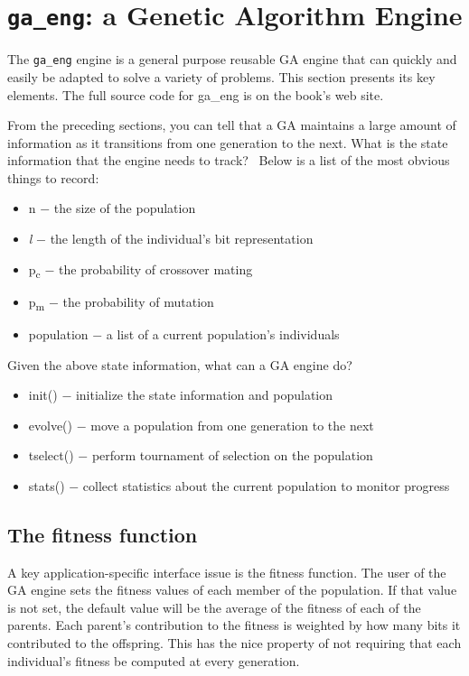 \section{\texttt{ga\_eng}: a Genetic Algorithm Engine}

The \texttt{ga\_eng} engine is a general purpose reusable GA engine that
can quickly and easily be adapted to solve a variety of problems. This
section presents its key elements. The full source
code for \textsf{ga\_eng} is on the book's web site.

From the preceding sections, you can tell that a GA maintains a large
amount of information as it transitions from one generation to the
next. What is the state information that the engine needs to track?
\ Below is a list of the most obvious things to record:

\begin{itemize}
\item n $-$ the size of the population
\item \textit{l} $-$ the length of the individual's bit
representation
\item p\textsubscript{c} $-$ the probability of crossover mating
\item p\textsubscript{m} $-$ the probability of mutation
\item population $-$ a list of a current population's
individuals
\end{itemize}
Given the above state information, what can a GA engine do?

\begin{itemize}
\item \textsf{init()} $-$ initialize the state information and
population
\item \textsf{evolve()} $-$ move a population from one generation to the
next
\item \textsf{tselect()} $-$ perform tournament of selection on the
population
\item \textsf{stats()} $-$ collect statistics about the current
population to monitor progress
\end{itemize}

\subsection{The fitness function}

A key application-specific interface issue is the fitness function. The
user of the GA engine sets the fitness values of each member of the
population. If that value is not set, the default value will be the
average of the fitness of each of the parents. Each
parent's contribution to the fitness is weighted by
how many bits it contributed to the offspring. This has the nice
property of not requiring that each individual's
fitness be computed at every generation.

